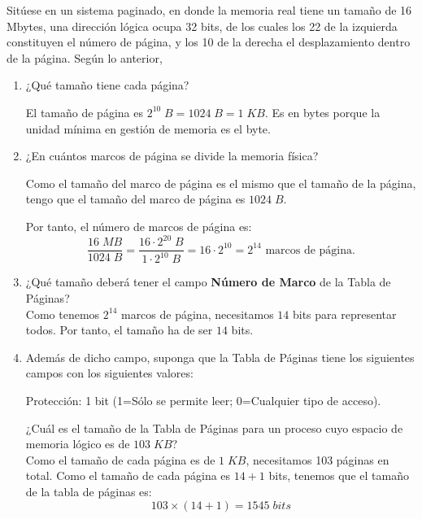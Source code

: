 \begin{ejercicio}\label{ej:2.Ejercicio15}
    Sitúese en un sistema paginado, en donde la memoria real tiene un tamaño de 16 Mbytes, una dirección lógica ocupa 32 bits, de los cuales los 22 de la izquierda constituyen el número de página, y los 10 de la derecha el desplazamiento dentro de la página. Según lo anterior,
    \begin{enumerate}
        \item ¿Qué tamaño tiene cada página?
        
        El tamaño de página es $2^{10}\;B=1024\;B=1\;KB$. Es en bytes porque la unidad mínima en gestión de memoria es el byte.        
        
        \item ¿En cuántos marcos de página se divide la memoria física?

        Como el tamaño del marco de página es el mismo que el tamaño de la página, tengo que el tamaño del marco de página es $1024\;B$.
        
        Por tanto, el número de marcos de página es:
        \begin{equation*}
            \frac{16\;MB}{1024\;B}=
            \frac{16\cdot 2^{20}\;B}{1\cdot 2^{10}\;B}
            =16\cdot 2^{10}
            = 2^{14} \text{ marcos de página}.
        \end{equation*}

        \item ¿Qué tamaño deberá tener el campo \textbf{Número de Marco} de la Tabla de Páginas?\\
        Como tenemos $2^{14}$ marcos de página, necesitamos $14$ bits para representar todos. Por tanto, el tamaño ha de ser $14$ bits.

        \item Además de dicho campo, suponga que la Tabla de Páginas tiene los siguientes campos con los siguientes valores:
        
        Protección: 1 bit \qquad (1=Sólo se permite leer; 0=Cualquier tipo de acceso).
        
        ¿Cuál es el tamaño de la Tabla de Páginas para un proceso cuyo espacio de memoria lógico es de $103\;KB$?\\

        Como el tamaño de cada página es de $1\;KB$, necesitamos 103 páginas en total. Como el tamaño de cada página es $14+1$ bits, tenemos que el tamaño de la tabla de páginas es:
        \begin{equation*}
            103\times(14+1) = 1545\;bits
        \end{equation*}
    \end{enumerate}
\end{ejercicio}


